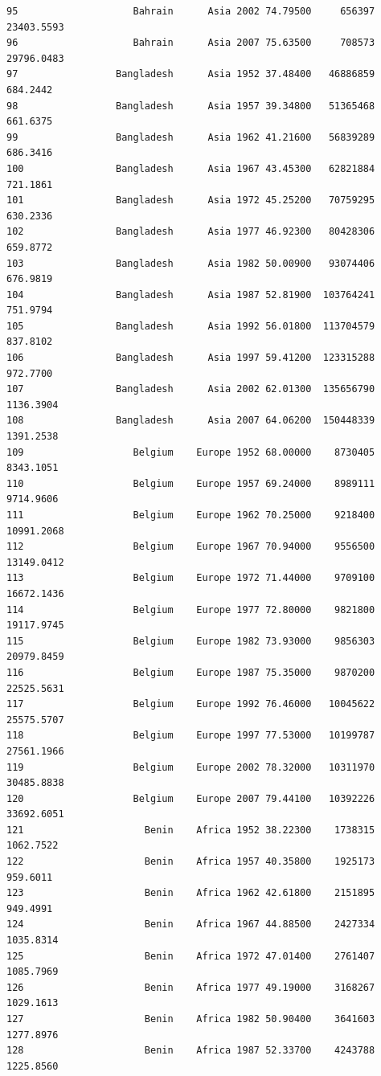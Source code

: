 \documentclass[
  letterpaper,
  DIV=11,
  numbers=noendperiod]{scrreprt}
\begin{document}
\begin{verbatim}
95                    Bahrain      Asia 2002 74.79500     656397  23403.5593
96                    Bahrain      Asia 2007 75.63500     708573  29796.0483
97                 Bangladesh      Asia 1952 37.48400   46886859    684.2442
98                 Bangladesh      Asia 1957 39.34800   51365468    661.6375
99                 Bangladesh      Asia 1962 41.21600   56839289    686.3416
100                Bangladesh      Asia 1967 43.45300   62821884    721.1861
101                Bangladesh      Asia 1972 45.25200   70759295    630.2336
102                Bangladesh      Asia 1977 46.92300   80428306    659.8772
103                Bangladesh      Asia 1982 50.00900   93074406    676.9819
104                Bangladesh      Asia 1987 52.81900  103764241    751.9794
105                Bangladesh      Asia 1992 56.01800  113704579    837.8102
106                Bangladesh      Asia 1997 59.41200  123315288    972.7700
107                Bangladesh      Asia 2002 62.01300  135656790   1136.3904
108                Bangladesh      Asia 2007 64.06200  150448339   1391.2538
109                   Belgium    Europe 1952 68.00000    8730405   8343.1051
110                   Belgium    Europe 1957 69.24000    8989111   9714.9606
111                   Belgium    Europe 1962 70.25000    9218400  10991.2068
112                   Belgium    Europe 1967 70.94000    9556500  13149.0412
113                   Belgium    Europe 1972 71.44000    9709100  16672.1436
114                   Belgium    Europe 1977 72.80000    9821800  19117.9745
115                   Belgium    Europe 1982 73.93000    9856303  20979.8459
116                   Belgium    Europe 1987 75.35000    9870200  22525.5631
117                   Belgium    Europe 1992 76.46000   10045622  25575.5707
118                   Belgium    Europe 1997 77.53000   10199787  27561.1966
119                   Belgium    Europe 2002 78.32000   10311970  30485.8838
120                   Belgium    Europe 2007 79.44100   10392226  33692.6051
121                     Benin    Africa 1952 38.22300    1738315   1062.7522
122                     Benin    Africa 1957 40.35800    1925173    959.6011
123                     Benin    Africa 1962 42.61800    2151895    949.4991
124                     Benin    Africa 1967 44.88500    2427334   1035.8314
125                     Benin    Africa 1972 47.01400    2761407   1085.7969
126                     Benin    Africa 1977 49.19000    3168267   1029.1613
127                     Benin    Africa 1982 50.90400    3641603   1277.8976
128                     Benin    Africa 1987 52.33700    4243788   1225.8560

\end{verbatim}
\end{document}
